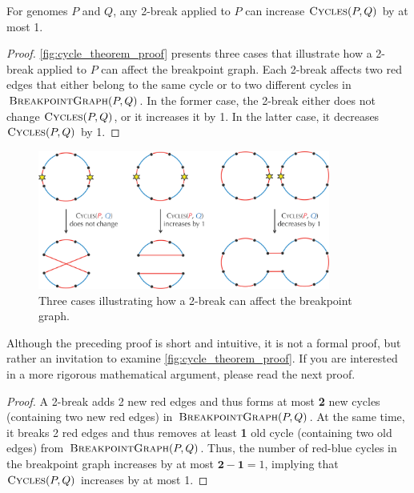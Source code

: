 \begin{namedtheorem}[Cycle]
For genomes $P$ and $Q$, any 2-break applied to $P$ can increase $\text{\scshape Cycles}(P, Q)$ by at most 1. 
\end{namedtheorem}

\begin{proof}
\autoref{fig:cycle_theorem_proof} presents three cases that illustrate how a 2-break applied to $P$ can affect the breakpoint graph. Each 2-break affects two red edges that either belong to the same cycle or to two different cycles in $\text{\scshape BreakpointGraph}(P, Q)$. In the former case, the 2-break either does not change $\text{\scshape Cycles}(P, Q)$, or it increases it by 1. In the latter case, it decreases $\text{\scshape Cycles}(P, Q)$ by 1.
\end{proof}

\begin{figure}[h]
\mySfFamily
\centering
\includegraphics[width = 0.856\textwidth]{images/rearrangements/cycle_theorem_proof}
\caption{Three cases illustrating how a 2-break can affect the breakpoint graph.}
\label{fig:cycle_theorem_proof}
\end{figure}

Although the preceding proof is short and intuitive, it is not a formal proof, but rather an invitation to examine \autoref{fig:cycle_theorem_proof}. If you are interested in a more rigorous mathematical argument, please read the next proof.

\begin{proof}
A 2-break adds 2 new red edges and thus forms at most \textbf{2} new cycles (containing two new red edges) in $\text{\scshape BreakpointGraph}(P, Q)$.  At the same time, it breaks 2 red edges and thus removes at least \textbf{1} old cycle (containing two old edges) from $\text{\scshape BreakpointGraph}(P, Q)$.  Thus, the number of red-blue cycles in the breakpoint graph increases by at most $\textbf{2} - \textbf{1} = 1$, implying that $\text{\scshape Cycles}(P, Q)$ increases by at most 1.
\end{proof}

